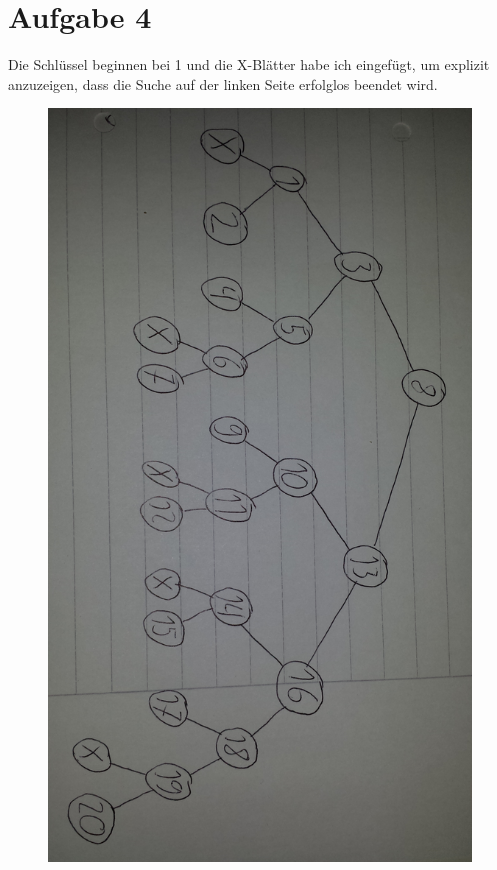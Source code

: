 \documentclass[10pt,a4paper]{article}
\begin{document}
\section{Aufgabe 4}
Die Schlüssel beginnen bei 1 und die X-Blätter habe ich eingefügt, um explizit anzuzeigen, dass die Suche auf der linken Seite erfolglos beendet wird.
\begin{figure}[H]
  \includegraphics[width=400pt]{6_4}
\end{figure}
\end{document}
